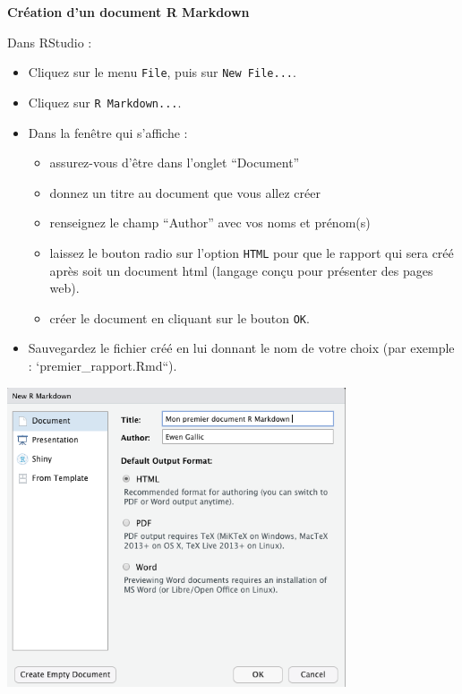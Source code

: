 \documentclass[
  11pt,
]{book}
\providecommand{\tightlist}{%
  \setlength{\itemsep}{0pt}\setlength{\parskip}{0pt}}
\numberwithin{equation}{section}
\numberwithin{countremarque}{section}
\newenvironment{greenbox}{
  \begin{tcolorbox}[breakable, colback=vert,coltext=black,
                  colframe=grisfonce]}
 {\end{tcolorbox}}
\begin{document}
\begin{greenbox}
\textbf{Création d'un document R Markdown}

Dans RStudio :

\begin{itemize}
\item
  Cliquez sur le menu \texttt{File}, puis sur \texttt{New\ File...}.
\item
  Cliquez sur \texttt{R\ Markdown...}.
\item
  Dans la fenêtre qui s'affiche :

  \begin{itemize}
  \tightlist
  \item
    assurez-vous d'être dans l'onglet ``Document''
  \item
    donnez un titre au document que vous allez créer
  \item
    renseignez le champ ``Author'' avec vos noms et prénom(s)
  \item
    laissez le bouton radio sur l'option \texttt{HTML} pour que le rapport qui sera créé après soit un document html (langage conçu pour présenter des pages web).
  \item
    créer le document en cliquant sur le bouton \texttt{OK}.
  \end{itemize}
\item
  Sauvegardez le fichier créé en lui donnant le nom de votre choix (par exemple : `premier\_rapport.Rmd``).
\end{itemize}

\includegraphics[width=0.75\textwidth,height=\textheight]{figs/creation_markdown.png}

\end{greenbox}
\end{document}
